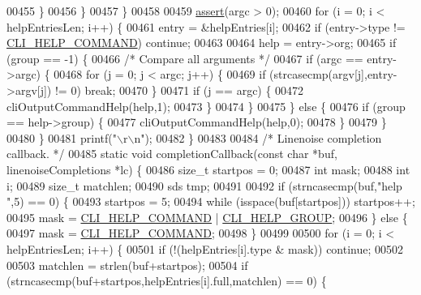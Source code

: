 \begin{DoxyCode}
{{{{{{{{{{{{00455             \}
00456         \}
00457     \}
00458 
00459     \hyperlink{redisassert_8h_a993abaa2c168852c1592879472938781}{assert}(argc > 0);
00460     \textcolor{keywordflow}{for} (i = 0; i < helpEntriesLen; i++) \{
00461         entry = &helpEntries[i];
00462         \textcolor{keywordflow}{if} (entry->type != \hyperlink{redis-cli_8c_ad5a18b7d635c6438f512f3c5d7f9f546}{CLI\_HELP\_COMMAND}) \textcolor{keywordflow}{continue};
00463 
00464         help = entry->org;
00465         \textcolor{keywordflow}{if} (group == -1) \{
00466             \textcolor{comment}{/* Compare all arguments */}
00467             \textcolor{keywordflow}{if} (argc == entry->argc) \{
00468                 \textcolor{keywordflow}{for} (j = 0; j < argc; j++) \{
00469                     \textcolor{keywordflow}{if} (strcasecmp(argv[j],entry->argv[j]) != 0) \textcolor{keywordflow}{break};
00470                 \}
00471                 \textcolor{keywordflow}{if} (j == argc) \{
00472                     cliOutputCommandHelp(help,1);
00473                 \}
00474             \}
00475         \} \textcolor{keywordflow}{else} \{
00476             \textcolor{keywordflow}{if} (group == help->group) \{
00477                 cliOutputCommandHelp(help,0);
00478             \}
00479         \}
00480     \}
00481     printf(\textcolor{stringliteral}{"\(\backslash\)r\(\backslash\)n"});
00482 \}
00483 
00484 \textcolor{comment}{/* Linenoise completion callback. */}
00485 \textcolor{keyword}{static} \textcolor{keywordtype}{void} completionCallback(\textcolor{keyword}{const} \textcolor{keywordtype}{char} *buf, linenoiseCompletions *lc) \{
00486     size\_t startpos = 0;
00487     \textcolor{keywordtype}{int} mask;
00488     \textcolor{keywordtype}{int} i;
00489     size\_t matchlen;
00490     sds tmp;
00491 
00492     \textcolor{keywordflow}{if} (strncasecmp(buf,\textcolor{stringliteral}{"help "},5) == 0) \{
00493         startpos = 5;
00494         \textcolor{keywordflow}{while} (isspace(buf[startpos])) startpos++;
00495         mask = \hyperlink{redis-cli_8c_ad5a18b7d635c6438f512f3c5d7f9f546}{CLI\_HELP\_COMMAND} | \hyperlink{redis-cli_8c_a3cac9e62f8d124c91f892f2236135589}{CLI\_HELP\_GROUP};
00496     \} \textcolor{keywordflow}{else} \{
00497         mask = \hyperlink{redis-cli_8c_ad5a18b7d635c6438f512f3c5d7f9f546}{CLI\_HELP\_COMMAND};
00498     \}
00499 
00500     \textcolor{keywordflow}{for} (i = 0; i < helpEntriesLen; i++) \{
00501         \textcolor{keywordflow}{if} (!(helpEntries[i].type & mask)) \textcolor{keywordflow}{continue};
00502 
00503         matchlen = strlen(buf+startpos);
00504         \textcolor{keywordflow}{if} (strncasecmp(buf+startpos,helpEntries[i].full,matchlen) == 0) \{
}}}}}}}}}}}}
\end{DoxyCode}
